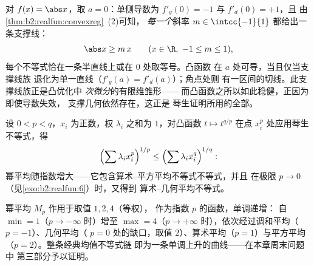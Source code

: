 \begin{example}[角点与支撑线族]\label{ex:b2:realfun:corner}
对 $f(x) = \abs x$，取 $a = 0$：单侧导数为
$f'_g(0) = -1$ 与 $f'_d(0) = +1$，且
由\cref{thm:b2:realfun:convexreg}~(2)可知，
\emph{每一个}斜率 $m \in \intcc{-1}{1}$ 都给出一条支撑线：
\[
\abs x \geq m\,x \qquad (x \in \R,\ -1 \leq m \leq 1),
\]
每个不等式恰在一条半直线上或在 $0$ 处取等号。凸函数
在 $a$ 处可导，当且仅当支撑线族
退化为单一直线（$f'_g(a) = f'_d(a)$）；角点处则
有一区间的切线。此支撑线族正是凸优化中
\emph{次微分}的有限维雏形——
而凸函数之所以如此稳健，正因为即使导数失效，
支撑几何依然存在，这正是
琴生证明所用的全部。
\end{example}

\begin{example}[幂平均不等式]\label{ex:b2:realfun:powermeans}
设 $0 < p < q$，$x_i$ 为正数，权 $\lambda_i$
之和为 $1$，对凸函数 $t \mapsto t^{q/p}$
在点 $x_i^p$ 处应用琴生不等式，得
\[
\Bigl(\sum \lambda_i x_i^{p}\Bigr)^{1/p}
\leq \Bigl(\sum \lambda_i x_i^{q}\Bigr)^{1/q} :
\]
幂平均随指数增大——它包含算术–平方平均不等式不等式，并且
在极限 $p \to 0$（见\cref{exo:b2:realfun:6}）时，又得到
算术–几何平均不等式。
\end{example}

\begin{omfigure}

{\small 幂平均 $M_p$ 作用于取值 $1, 2, 4$（等权），
作为指数 $p$ 的函数，单调递增：
自 $\min = 1$（$p \to -\infty$ 时）增至 $\max = 4$（$p \to
+\infty$ 时），依次经过调和平均（$p = -1$）、几何平均（
$p = 0$ 处的缺口，取值 $2$）、算术平均（$p = 1$）与平方平均（$p
= 2$）。整条经典均值不等式链
即为一条单调上升的曲线——在本章周末问题中
第三部分予以证明。}
\end{omfigure}

